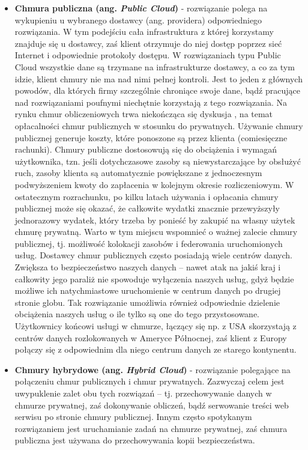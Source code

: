 \documentclass[10pt,a4paper,titlepage,twoside]{report}
\begin{document}
\begin{itemize}
	\item \textbf{Chmura publiczna (ang. \textit{Public Cloud})} - rozwiązanie polega na wykupieniu u wybranego dostawcy (ang. providera) odpowiedniego rozwiązania. W tym podejściu cała infrastruktura z której korzystamy znajduje się u dostawcy, zaś klient otrzymuje do niej dostęp poprzez sieć Internet i odpowiednie protokoły dostępu\cite{ad12}. W rozwiązaniach typu Public Cloud wszystkie dane są trzymane na infrastrukturze dostawcy, a co za tym idzie, klient chmury nie ma nad nimi pełnej kontroli. Jest to jeden z głównych powodów, dla których firmy szczególnie chroniące swoje dane, bądź pracujące nad rozwiązaniami poufnymi niechętnie korzystają z tego rozwiązania\cite{ad11}. Na rynku chmur obliczeniowych trwa niekończąca się dyskusja \cite{ad13}, na temat opłacalności chmur publicznych w stosunku do prywatnych. Używanie chmury publicznej generuje koszty, które ponoszone są przez klienta (comiesięczne rachunki). Chmury publiczne dostosowują się do obciążenia i wymagań użytkownika, tzn. jeśli dotychczasowe zasoby są niewystarczające by obsłużyć ruch, zasoby klienta są automatycznie powiększane z jednoczesnym podwyższeniem kwoty do zapłacenia w kolejnym okresie rozliczeniowym. W ostatecznym rozrachunku, po kilku latach używania i opłacania chmury publicznej może się okazać, że całkowite wydatki znacznie przewyższyły jednorazowy wydatek, który trzeba by ponieść by zakupić na własny użytek chmurę prywatną. Warto w tym miejscu wspomnieć o ważnej zalecie chmury publicznej, tj. możliwość kolokacji zasobów i federowania uruchomionych usług. Dostawcy chmur publicznych często posiadają wiele centrów danych\cite{ad11}. Zwiększa to bezpieczeństwo naszych danych – nawet atak na jakiś kraj i całkowity jego paraliż nie spowoduje wyłączenia naszych usług, gdyż będzie możliwe ich natychmiastowe uruchomienie w centrum danych po drugiej stronie globu. Tak rozwiązanie umożliwia również odpowiednie dzielenie obciążenia naszych usług o ile tylko są one do tego przystosowane. Użytkownicy końcowi usługi w chmurze, łączący się np. z USA skorzystają z centrów danych rozlokowanych w Ameryce Północnej, zaś klient z Europy połączy się z odpowiednim dla niego centrum danych ze starego kontynentu\cite{ad11}.
	\item \textbf{Chmury hybrydowe (ang. \textit{Hybrid Cloud})} - rozwiązanie polegające na połączeniu chmur publicznych i chmur prywatnych\cite{ad13}. Zazwyczaj celem jest uwypuklenie zalet obu tych rozwiązań – tj. przechowywanie danych w chmurze prywatnej, zaś dokonywanie obliczeń, bądź serwowanie treści web serwisu po stronie chmury publicznej. Innym często spotykanym rozwiązaniem jest uruchamianie zadań na chmurze prywatnej, zaś chmura publiczna jest używana do przechowywania kopii bezpieczeństwa\cite{ad13}.
\end{itemize}
\end{document}
